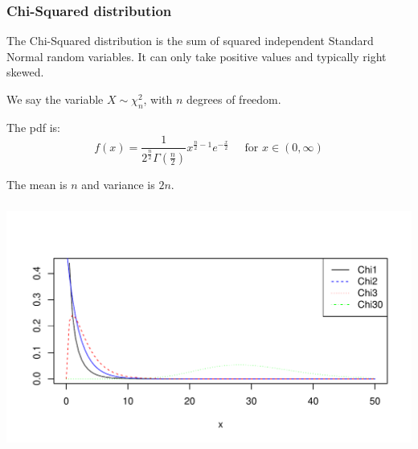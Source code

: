 \documentclass[t,xcolor=pdftex,dvipsnames,table]{beamer}
\makeatletter
\def\maxwidth{ %
  \ifdim\Gin@nat@width>\linewidth
    \linewidth
  \else
    \Gin@nat@width
  \fi
}
\newenvironment{knitrout}{}{} %
\makeatother
\begin{document}
\begin{frame}\frametitle{Chi-Squared distribution}

\vspace{.5cm}
\begin{definition}
The \alert{Chi-Squared distribution} is the sum of squared independent Standard Normal random variables. It can only take positive values and typically right skewed.

\vspace{.5cm}
We say the variable $X \sim \chi^2_{n}$, with $n$ degrees of freedom.

\vspace{.5cm}
The pdf is:
\[ f(x)  =  \frac{ 1}  { 2^{\frac{n}{2}} \Gamma(\frac{n}{2})}
x^{\frac{n}{2}-1} e^{-\frac{x}{2}}
\;\;\;\;\; \mbox{for }  x \in (0, \infty) \]

\vspace{.5cm}
The mean is $n$ and variance is $2 n$.
\end{definition}

\end{frame}



\begin{frame}[fragile]\frametitle{}
\begin{knitrout}
\color{fgcolor}
\includegraphics[width=\maxwidth]{figure/unnamed-chunk-24-1} 

\end{knitrout}

\end{frame}
\end{document}
